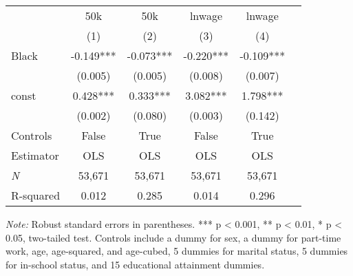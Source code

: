 \begin{tabular}{lccccc}
\toprule
 &        50k &        50k &     lnwage &     lnwage \\
\cline{2-5}
{} &        (1) &        (2) &        (3) &        (4) \\
\toprule
Black              &  -0.149*** &  -0.073*** &  -0.220*** &  -0.109*** \\
                   &    (0.005) &    (0.005) &    (0.008) &    (0.007) \\
const              &   0.428*** &   0.333*** &   3.082*** &   1.798*** \\
                   &    (0.002) &    (0.080) &    (0.003) &    (0.142) \\
Controls  &      False &       True &      False &       True \\
\midrule
Estimator          &        OLS &        OLS &        OLS &        OLS \\
\midrule
\textit{N}                  &     53,671 &     53,671 &     53,671 &     53,671 \\
R-squared          &      0.012 &      0.285 &      0.014 &      0.296 \\
\bottomrule
\end{tabular}

\begin{singlespace} \noindent \textit{Note:} Robust standard errors in parentheses. *** p < 0.001, ** p < 0.01, * p < 0.05, two-tailed test. Controls include a dummy for sex, a dummy for part-time work, age, age-squared, and age-cubed, 5 dummies for marital status, 5 dummies for in-school status, and 15 educational attainment dummies. \end{singlespace}